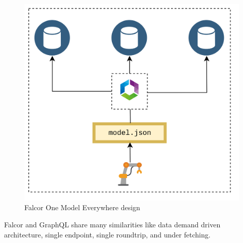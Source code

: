 	\begin{figure}[!htbp] 
		\begin{center}
			\includegraphics[trim={0 0 0 2cm},clip,scale=0.09]{./images/png/one_model_everywhere}	
			\caption{ Falcor One Model Everywhere design \cite{misc03} }	
			\label{fig:one_model_everywhere}	
		\end{center}
	\end{figure}
	Falcor and GraphQL share many similarities like data demand driven architecture, single endpoint, single roundtrip, and under fetching.
	
